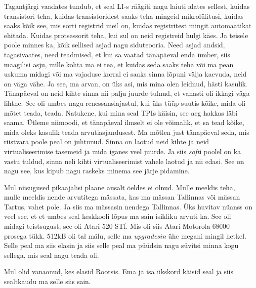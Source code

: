 Tagantjärgi  vaadates tundub, et  seal LI-s räägiti nagu laiuti alates sellest, 
kuidas transistori teha, kuidas transistoridest saaks teha mingeid 
mikrolülitusi, kuidas saaks kõik see, mis sorti registrid meil on, kuidas 
registritest mingit automaatikat ehitada. Kuidas protsessorit teha, kui sul on 
neid registreid hulgi käes. Ja  teisele  poole minnes ka, kõik sellised asjad 
nagu siduteooria. Need asjad andsid, tagasivaates, need teadmised, et kui sa 
vaatad tänapäeval enda ümber, siis maagilisi asju, mille kohta ma ei tea, et 
kuidas seda saaks teha või ma pean uskuma midagi või ma vajaduse korral ei 
saaks sinna lõpuni välja kaevuda, neid on väga vähe. Ja see, ma arvan, on üks 
asi, mis mina olen leidnud, hästi kasulik. Tänapäeval on neid kihte sinna nii 
palju juurde tulnud, et vanasti oli ikkagi väga lihtne. See oli umbes nagu 
renessansiajastul, kui üks tüüp suutis  kõike, mida oli mõtet teada, teada. 
Natukene, kui  mina seal TPIs käisin, see aeg hakkas läbi saama. Ütleme 
niimoodi, et tänapäeval ilmselt ei ole võimalik, et sa tead kõike, mida oleks 
kasulik teada arvutiasjandusest. Ma mõtlen just tänapäeval seda, mis riistvara 
poole peal on juhtunud. Sinna on laotud neid kihte ja neid virtualiseerimise 
tasemeid ja mida iganes veel juurde. Ja siis \emph{soft}i poolel on ka vastu 
tuldud, sinna neli kihti virtualiseerimist vahele laotud ja nii edasi. See on 
nagu see, kus kipub nagu raskeks minema see järje pidamine.


Mul niisugused pikaajalisi plaane ausalt öeldes ei olnud. Mulle meeldis teha, 
mulle meeldis nende arvutitega mässata, kas ma mässan Tallinnas või mässan 
Tartus, vahet pole. Ja siis ma mässasin nendega Tallinnas. Üks huvitav nüanss 
on veel see, et et umbes seal keskkooli lõpus ma sain isikliku arvuti ka. See 
oli midagi teistsugust, see oli Atari 520 STf. Mis 
oli siis Atari Motorola 68000 prosega tükk. 512kB oli tal mälu, selle ma 
\emph{upgradesin}  ühe megani mingil hetkel. Selle peal ma siis elasin ja 
siis selle peal ma püüdsin nagu süvitsi minna kogu sellega, mis seal nagu teada 
oli. 



Mul olid vanaonud, kes elasid Rootsis. Ema ja isa ükskord käisid seal ja siis 
sealtkaudu ma selle siis sain. 


